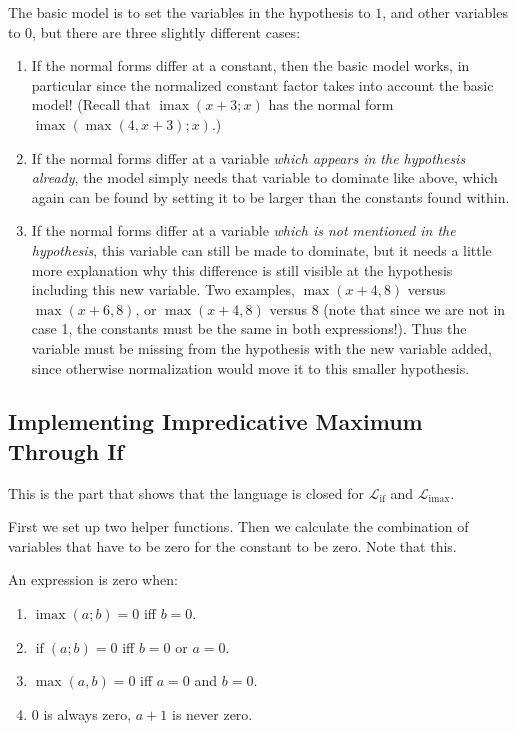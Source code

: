 \documentclass[11pt, twoside, reqno]{book}
\DeclareMathOperator{\imax}{imax}
\DeclareMathOperator{\ifop}{if}
\begin{document}
The basic model is to set the variables in the hypothesis to \(1\), and other variables to \(0\), but there are three slightly different cases:
\begin{enumerate}
\item
  If the normal forms differ at a constant, then the basic model works, in particular since the normalized constant factor takes into account the basic model!
  (Recall that \(\imax(x+3; x)\) has the normal form \(\imax(\max(4, x+3); x)\).)
\item
  If the normal forms differ at a variable \emph{which appears in the hypothesis already}, the model simply needs that variable to dominate like above, which again can be found by setting it to be larger than the constants found within.
\item
  If the normal forms differ at a variable \emph{which is not mentioned in the hypothesis}, this variable can still be made to dominate, but it needs a little more explanation why this difference is still visible at the hypothesis including this new variable.
  Two examples, \(\max(x+4, 8)\) versus \(\max(x+6, 8)\), or \(\max(x+4, 8)\) versus \(8\) (note that since we are not in case 1, the constants must be the same in both expressions!).
  Thus the variable must be missing from the hypothesis with the new variable added, since otherwise normalization would move it to this smaller hypothesis.
\end{enumerate}



\subsection{Implementing Impredicative Maximum Through If}
This is the part that shows that the language is closed for \(\mathcal{L}_{\ifop}\) and \(\mathcal{L}_{\imax}\).

First we set up two helper functions.
Then we calculate the combination of variables that have to be zero for the constant to be zero.
Note that this.

An expression is zero when:
\begin{enumerate}
\item \(\imax(a; b) = 0\) iff \(b = 0\).
\item \(\ifop(a; b) = 0\) iff \(b = 0\) or \(a = 0\).
\item \(\max(a, b) = 0\) iff \(a = 0\) and \(b = 0\).
\item \(0\) is always zero, \(a+1\) is never zero.
\end{enumerate}
\end{document}
